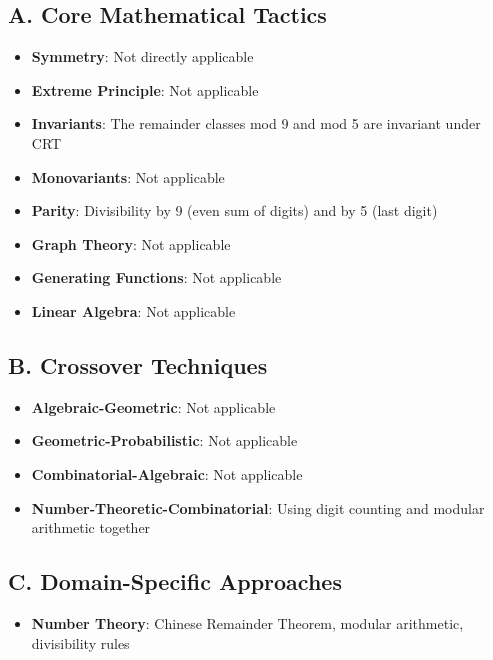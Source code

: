 \documentclass[11pt]{article}
\begin{document}
\begin{tacticalbox}
\subsection*{A. Core Mathematical Tactics}
\begin{itemize}[leftmargin=*]
    \item \textbf{Symmetry}: Not directly applicable
    
    \item \textbf{Extreme Principle}: Not applicable
    
    \item \textbf{Invariants}: The remainder classes mod 9 and mod 5 are invariant under CRT
    
    \item \textbf{Monovariants}: Not applicable
    
    \item \textbf{Parity}: Divisibility by 9 (even sum of digits) and by 5 (last digit)
    
    \item \textbf{Graph Theory}: Not applicable
    
    \item \textbf{Generating Functions}: Not applicable
    
    \item \textbf{Linear Algebra}: Not applicable
\end{itemize}

\subsection*{B. Crossover Techniques}
\begin{itemize}[leftmargin=*]
    \item \textbf{Algebraic-Geometric}: Not applicable
    
    \item \textbf{Geometric-Probabilistic}: Not applicable
    
    \item \textbf{Combinatorial-Algebraic}: Not applicable
    
    \item \textbf{Number-Theoretic-Combinatorial}: Using digit counting and modular arithmetic together
\end{itemize}

\subsection*{C. Domain-Specific Approaches}
\begin{itemize}[leftmargin=*]
    \item \textbf{Number Theory}: Chinese Remainder Theorem, modular arithmetic, divisibility rules
    

\end{itemize}
\end{tacticalbox}
\end{document}
